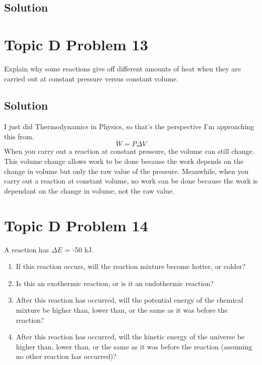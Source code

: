 \documentclass[10pt]{article}
\begin{document}
        \subsection{Solution}

    \pagebreak
    \section{Topic D Problem 13}
        Explain why some reactions give off different amounts of heat when they are carried out at constant pressure versus constant volume.
        
        \subsection{Solution}
            I just did Thermodynamics in Physics, so that's the perspective I'm approaching this from.
            \begin{equation}
                W   =   P \Delta V
            \end{equation}
            When you carry out a reaction at constant pressure, the volume can still change. 
            This volume change allows work to be done because the work depends on the change in volume but only the raw value of the pressure.
            Meanwhile, when you carry out a reaction at constant volume, no work can be done because the work is dependant on the change in volume, not the raw value. 

    \pagebreak
    \section{Topic D Problem 14}
        A reaction has $\Delta E$ = -50 kJ.
        \begin{enumerate}[label=\alph*)]
            \item   If this reaction occurs, will the reaction mixture become hotter, or colder?
            \item   Is this an exothermic reaction, or is it an endothermic reaction?
            \item   After this reaction has occurred, will the potential energy of the chemical mixture be higher than, lower than, or the same as it was before the reaction?
            \item   After this reaction has occurred, will the kinetic energy of the universe be higher than, lower than, or the same as it was before the reaction (assuming no other reaction has occurred)?
        \end{enumerate}
        
\end{document}
